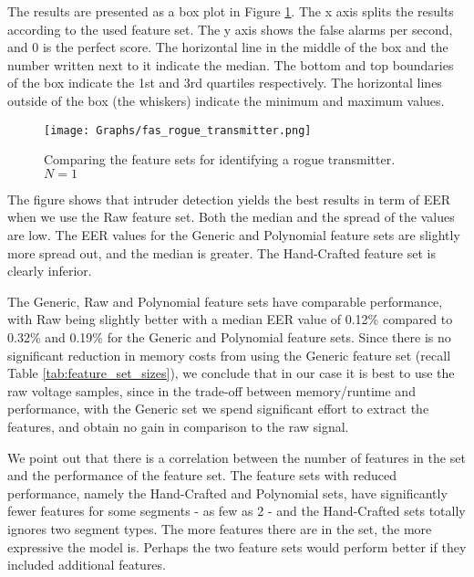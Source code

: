 \documentclass[compsoc,conference,a4paper,10pt,times]{IEEEtran}
\begin{document}
  The results are presented as a box plot in Figure \ref{fig:rogue_transmitter_results}. The x axis splits the results according to the used feature set. The y axis shows the false alarms per second, and 0 is the perfect score. The horizontal line in the middle of the box and the number written next to it indicate the median. The bottom and top boundaries of the box indicate the 1st and 3rd quartiles respectively. The horizontal lines outside of the box (the whiskers) indicate the minimum and maximum values.
  
  \begin{figure}[t]
    \centering
    \texttt{[image: Graphs/fas\_rogue\_transmitter.png]}
    \caption{Comparing the feature sets for identifying a rogue transmitter. \(N = 1\)}
    \label{fig:rogue_transmitter_results}
  \end{figure}
  
  The figure shows that intruder detection yields the best results in term of EER when we use the Raw feature set. Both the median and the spread of the values are low. The EER values for the Generic and Polynomial feature sets are slightly more spread out, and the median is greater. The Hand-Crafted feature set is clearly inferior.
  
  The Generic, Raw and Polynomial feature sets have comparable performance, with Raw being slightly better with a median EER value of 0.12\% compared to 0.32\% and 0.19\% for the Generic and Polynomial feature sets. Since there is no significant reduction in memory costs from using the Generic feature set (recall Table \ref{tab:feature_set_sizes}), we conclude that in our case it is best to use the raw voltage samples, since in the trade-off between memory/runtime and performance, with the Generic set we spend significant effort to extract the features, and obtain no gain in comparison to the raw signal.
  
  We point out that there is a correlation between the number of features in the set and the performance of the feature set. The feature sets with reduced performance, namely the Hand-Crafted and Polynomial sets, have significantly fewer features for some segments - as few as 2 - and the Hand-Crafted sets totally ignores two segment types. The more features there are in the set, the more expressive the model is. Perhaps the two feature sets would perform better if they included additional features.
  
\end{document}
